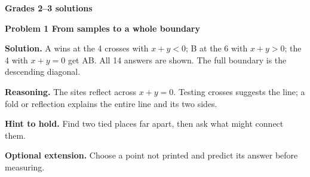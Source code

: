 \documentclass[letterpaper,11pt]{article}
\begin{document}
\vspace{.15in}
\newpage
{\Large\bfseries Grades 2--3 solutions}\par
\vspace{.08in}
{\large\bfseries Problem 1 From samples to a whole boundary}\par
\vspace{3pt}
\noindent\begin{minipage}[t]{.58\textwidth}\vspace{0pt}
\fontsize{10.8}{13.2}\selectfont
\textbf{Solution.} A wins at the 4 crosses with $x+y<0$; B at the 6 with $x+y>0$; the 4 with $x+y=0$ get AB. All 14 answers are shown. The full boundary is the descending diagonal.

\textbf{Reasoning.} The sites reflect across $x+y=0$. Testing crosses suggests the line; a fold or reflection explains the entire line and its two sides.

\textbf{Hint to hold.} Find two tied places far apart, then ask what might connect them.

\textbf{Optional extension.} Choose a point not printed and predict its answer before measuring.
\end{minipage}\hfill\begin{minipage}[t]{.40\textwidth}\vspace{0pt}\centering
{}
\end{minipage}
\end{document}
